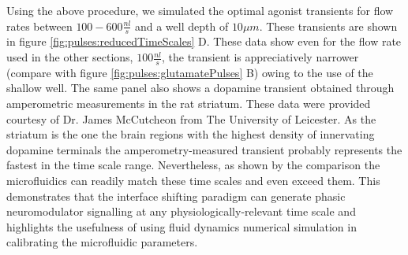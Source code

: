 Using the above procedure, we simulated the optimal agonist transients for flow rates between \(100-600 \frac{nl}{s}\) and a well depth of \(10\mu m\). These transients are shown in figure \ref{fig:pulses:reducedTimeScales} D. These data show even for the flow rate used in the other sections, \(100 \frac{nl}{s}\), the transient is appreciatively narrower (compare with figure \ref{fig:pulses:glutamatePulses} B) owing to the use of the shallow well. The same panel also shows a dopamine transient obtained through amperometric measurements in the rat striatum. These data were provided courtesy of Dr. James McCutcheon from The University of Leicester. As the striatum is the one the brain regions with the highest density of innervating dopamine terminals the amperometry-measured transient probably represents the fastest in the time scale range. Nevertheless, as shown by the comparison the microfluidics can readily match these time scales and even exceed them. This demonstrates that the interface shifting paradigm can generate phasic neuromodulator signalling at any physiologically-relevant time scale and highlights the usefulness of using fluid dynamics numerical simulation in calibrating the microfluidic parameters.


